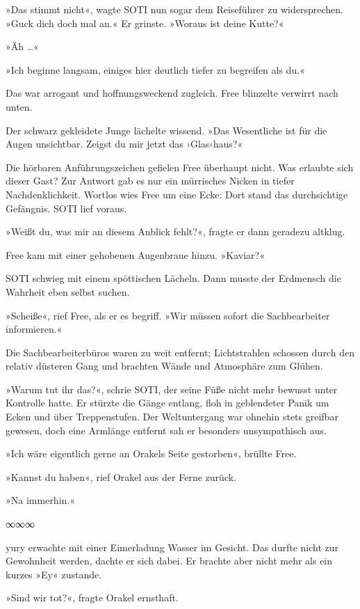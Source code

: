 »Das stimmt nicht«, wagte SOTI nun sogar dem Reiseführer zu widersprechen. »Guck dich doch mal an.« Er grinste. »Woraus ist deine Kutte?«

»Äh …«

»Ich beginne langsam, einiges hier deutlich tiefer zu begreifen als du.«

Das war arrogant und hoffnungsweckend zugleich. Free blinzelte verwirrt nach unten.

Der schwarz gekleidete Junge lächelte wissend. »Das Wesentliche ist für die Augen unsichtbar. Zeigst du mir jetzt das ›Glas‹haus?«

Die hörbaren Anführungszeichen gefielen Free überhaupt nicht. Was erlaubte sich dieser Gast? Zur Antwort gab es nur ein mürrisches Nicken in tiefer Nachdenklichkeit. Wortlos wies Free um eine Ecke: Dort stand das durchsichtige Gefängnis. SOTI lief voraus.

»Weißt du, was mir an diesem Anblick fehlt?«, fragte er dann geradezu altklug.

Free kam mit einer gehobenen Augenbraue hinzu. »Kaviar?«

SOTI schwieg mit einem spöttischen Lächeln. Dann musste der Erdmensch die Wahrheit eben selbst suchen.

»Scheiße«, rief Free, als er es begriff. »Wir müssen sofort die Sachbearbeiter informieren.«

Die Sachbearbeiterbüros waren zu weit entfernt; Lichtstrahlen schossen durch den relativ düsteren Gang und brachten Wände und Atmosphäre zum Glühen.

»Warum tut ihr das?«, schrie SOTI, der seine Füße nicht mehr bewusst unter Kontrolle hatte. Er stürzte die Gänge entlang, floh in geblendeter Panik um Ecken und über Treppenstufen. Der Weltuntergang war ohnehin stets greifbar gewesen, doch eine Armlänge entfernt sah er besonders unsympathisch aus.

»Ich wäre eigentlich gerne an Orakels Seite gestorben«, brüllte Free.

»Kannst du haben«, rief Orakel aus der Ferne zurück.

»Na immerhin.«

\begin{center}
∞∞∞
\end{center}

yury erwachte mit einer Eimerladung Wasser im Gesicht. Das durfte nicht zur Gewohnheit werden, dachte er sich dabei. Er brachte aber nicht mehr als ein kurzes »Ey« zustande.

»Sind wir tot?«, fragte Orakel ernsthaft.

